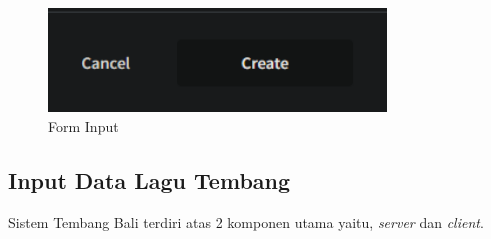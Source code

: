 \begin{figure}[H]
    \centering
    \includegraphics[width=0.8\textwidth]{assets/create.png}
    \caption{Form Input}
\end{figure}


\subsection{Input Data Lagu Tembang}
Sistem Tembang Bali terdiri atas 2 komponen utama yaitu, \textit{server} dan \textit{client}.